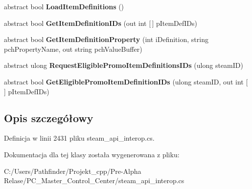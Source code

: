 \begin{DoxyCompactItemize}
\item 
\mbox{\label{class_valve_1_1_steamworks_1_1_i_steam_inventory_a1043e65d28eeeb09412520b9c63df01d}} 
abstract bool {\bfseries Load\+Item\+Definitions} ()
\item 
\mbox{\label{class_valve_1_1_steamworks_1_1_i_steam_inventory_aadef8ddb60650c0b22e88308da152dd2}} 
abstract bool {\bfseries Get\+Item\+Definition\+I\+Ds} (out int \mbox{[}$\,$\mbox{]} p\+Item\+Def\+I\+Ds)
\item 
\mbox{\label{class_valve_1_1_steamworks_1_1_i_steam_inventory_a5cf9b78e30909bd1502cc78d490ae487}} 
abstract bool {\bfseries Get\+Item\+Definition\+Property} (int i\+Definition, string pch\+Property\+Name, out string pch\+Value\+Buffer)
\item 
\mbox{\label{class_valve_1_1_steamworks_1_1_i_steam_inventory_a459caba25af18cfe5a79b767b16710bf}} 
abstract ulong {\bfseries Request\+Eligible\+Promo\+Item\+Definitions\+I\+Ds} (ulong steam\+ID)
\item 
\mbox{\label{class_valve_1_1_steamworks_1_1_i_steam_inventory_a3468deb7d73880ec02d28c45b5219847}} 
abstract bool {\bfseries Get\+Eligible\+Promo\+Item\+Definition\+I\+Ds} (ulong steam\+ID, out int \mbox{[}$\,$\mbox{]} p\+Item\+Def\+I\+Ds)
\end{DoxyCompactItemize}


\subsection{Opis szczegółowy}


Definicja w linii 2431 pliku steam\+\_\+api\+\_\+interop.\+cs.



Dokumentacja dla tej klasy została wygenerowana z pliku\+:\begin{DoxyCompactItemize}
\item 
C\+:/\+Users/\+Pathfinder/\+Projekt\+\_\+cpp/\+Pre-\/\+Alpha Relase/\+P\+C\+\_\+\+Master\+\_\+\+Control\+\_\+\+Center/steam\+\_\+api\+\_\+interop.\+cs\end{DoxyCompactItemize}
